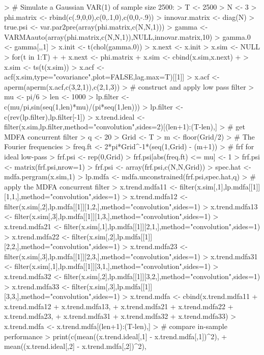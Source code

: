 \documentclass[a4paper]{book}
\begin{document}
\begin{Schunk}
\begin{Sinput}
> # Simulate a Gaussian VAR(1) of sample size 2500:
> T <- 2500
> N <- 3
> phi.matrix <- rbind(c(.9,0,0),c(0,.1,0),c(0,0,-.9))
> innovar.matrix <- diag(N)
> true.psi <- var.par2pre(array(phi.matrix,c(N,N,1)))
> gamma <- VARMAauto(array(phi.matrix,c(N,N,1)),NULL,innovar.matrix,10)
> gamma.0 <- gamma[,,1]
> x.init <- t(chol(gamma.0)) %
> x.next <- x.init
> x.sim <- NULL
> for(t in 1:T)
+ {
+ 	x.next <- phi.matrix %
+ 	x.sim <- cbind(x.sim,x.next)
+ }
> x.sim <- ts(t(x.sim))
> x.acf <- acf(x.sim,type="covariance",plot=FALSE,lag.max=T)[[1]]
> x.acf <- aperm(aperm(x.acf,c(3,2,1)),c(2,1,3))
> # construct and apply low pass filter
> mu <- pi/6
> len <- 1000
> lp.filter <- c(mu/pi,sin(seq(1,len)*mu)/(pi*seq(1,len)))
> lp.filter <- c(rev(lp.filter),lp.filter[-1])
> x.trend.ideal <- filter(x.sim,lp.filter,method="convolution",sides=2)[(len+1):(T-len),]
> # get MDFA concurrent filter
> q <- 20
> Grid <- T
> m <- floor(Grid/2)
> # The Fourier frequencies
> freq.ft <- 2*pi*Grid^{-1}*(seq(1,Grid) - (m+1))
> # frf for ideal low-pass
> frf.psi <- rep(0,Grid)
> frf.psi[abs(freq.ft) <= mu] <- 1
> frf.psi <- matrix(frf.psi,nrow=1) %
> frf.psi <- array(frf.psi,c(N,N,Grid))
> spec.hat <- mdfa.pergram(x.sim,1)	
> lp.mdfa <- mdfa.unconstrained(frf.psi,spec.hat,q)
> # apply the MDFA concurrent filter
> x.trend.mdfa11 <- filter(x.sim[,1],lp.mdfa[[1]][1,1,],method="convolution",sides=1)
> x.trend.mdfa12 <- filter(x.sim[,2],lp.mdfa[[1]][1,2,],method="convolution",sides=1)
> x.trend.mdfa13 <- filter(x.sim[,3],lp.mdfa[[1]][1,3,],method="convolution",sides=1)
> x.trend.mdfa21 <- filter(x.sim[,1],lp.mdfa[[1]][2,1,],method="convolution",sides=1)
> x.trend.mdfa22 <- filter(x.sim[,2],lp.mdfa[[1]][2,2,],method="convolution",sides=1)
> x.trend.mdfa23 <- filter(x.sim[,3],lp.mdfa[[1]][2,3,],method="convolution",sides=1)
> x.trend.mdfa31 <- filter(x.sim[,1],lp.mdfa[[1]][3,1,],method="convolution",sides=1)
> x.trend.mdfa32 <- filter(x.sim[,2],lp.mdfa[[1]][3,2,],method="convolution",sides=1)
> x.trend.mdfa33 <- filter(x.sim[,3],lp.mdfa[[1]][3,3,],method="convolution",sides=1)
> x.trend.mdfa <- cbind(x.trend.mdfa11 + x.trend.mdfa12 + x.trend.mdfa13,
+ 	x.trend.mdfa21 + x.trend.mdfa22 + x.trend.mdfa23,
+ 	x.trend.mdfa31 + x.trend.mdfa32 + x.trend.mdfa33)
> x.trend.mdfa <- x.trend.mdfa[(len+1):(T-len),] 
> # compare in-sample performance
> print(c(mean((x.trend.ideal[,1] - x.trend.mdfa[,1])^2),
+ 	mean((x.trend.ideal[,2] - x.trend.mdfa[,2])^2),

\end{Sinput}
\end{Schunk}
\end{document}
